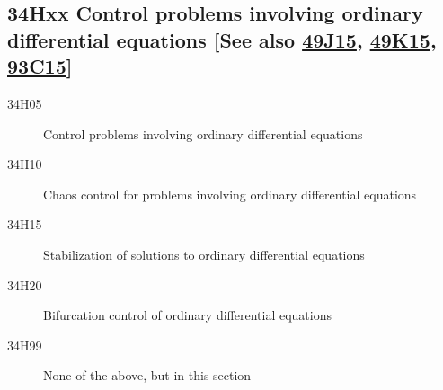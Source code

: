\documentclass[letterpaper]{article}
\begin{document}
\subsection*{34Hxx  Control problems involving ordinary differential equations [See also \hyperref[49J15]{49J15}, \hyperref[49K15]{49K15}, \hyperref[93C15]{93C15}] }\label{34Hxx}
\begin{description}  
\item [34H05]\label{34H05} Control problems involving ordinary differential equations
\item [34H10]\label{34H10} Chaos control for problems involving ordinary differential equations
\item [34H15]\label{34H15} Stabilization of solutions to ordinary differential equations
\item [34H20]\label{34H20} Bifurcation control of ordinary differential equations
\item [34H99]\label{34H99} None of the above, but in this section
\end{description}
\end{document}
